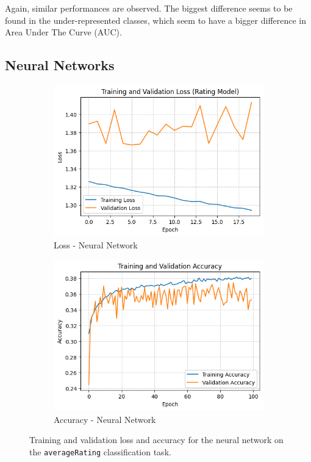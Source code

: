 Again, similar performances are observed. The biggest difference
seems to be found in the under-represented classes, which seem to
have a bigger difference in Area Under The Curve (AUC).




\subsection{Neural Networks}

\begin{figure}
    \centering
    \begin{subfigure}[b]{0.48\textwidth}
        \centering
        \includegraphics[width=\textwidth]{plotsss/loss_rating}
        \caption{Loss - Neural Network}
        \label{fig:loss_nn_rating}
    \end{subfigure}
    \hfill
    \begin{subfigure}[b]{0.48\textwidth}
        \centering
        \includegraphics[width=\textwidth]{plotsss/accuracy_rating.png}
        \caption{Accuracy - Neural Network}
        \label{fig:accuracy_nn_rating}
    \end{subfigure}
    \caption{Training and validation loss and accuracy for the neural network on the \texttt{averageRating} classification task.}
    \label{fig:nn_performance_rating}
\end{figure}

